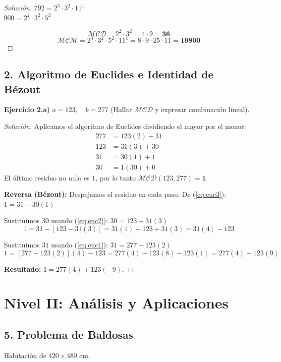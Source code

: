 \documentclass[12pt, letterpaper]{article}
\newenvironment{solucion}
    {\begin{proof}[Solución]}
    {\end{proof}}
\begin{document}
\begin{solucion}
    $792 = 2^3 \cdot 3^2 \cdot 11^1$ \\
    $900 = 2^2 \cdot 3^2 \cdot 5^2$
    
    \[ \mathcal{MCD} = 2^2 \cdot 3^2 = 4 \cdot 9 = \mathbf{36} \]
    \[ \mathcal{MCM} = 2^3 \cdot 3^2 \cdot 5^2 \cdot 11^1 = 8 \cdot 9 \cdot 25 \cdot 11 = \mathbf{19800} \]
\end{solucion}

\subsection*{2. Algoritmo de Euclides e Identidad de Bézout}

\textbf{Ejercicio 2.a)} $a = 123, \quad b = 277$ (Hallar $\mathcal{MCD}$ y expresar combinación lineal).

\begin{solucion}
    Aplicamos el algoritmo de Euclides dividiendo el mayor por el menor:
    \begin{align}
        277 &= 123(2) + 31 \label{eq:euc1} \\
        123 &= 31(3) + 30 \label{eq:euc2} \\
        31 &= 30(1) + 1 \label{eq:euc3} \\
        30 &= 1(30) + 0 \nonumber
    \end{align}
    El último residuo no nulo es $1$, por lo tanto $\mathcal{MCD}(123, 277) = \mathbf{1}$.

    \textbf{Reversa (Bézout):} Despejamos el residuo en cada paso.
    De (\ref{eq:euc3}): $1 = 31 - 30(1)$
    
    Sustituimos $30$ usando (\ref{eq:euc2}): $30 = 123 - 31(3)$
    \[ 1 = 31 - [123 - 31(3)] = 31(1) - 123 + 31(3) = 31(4) - 123 \]
    
    Sustituimos $31$ usando (\ref{eq:euc1}): $31 = 277 - 123(2)$
    \[ 1 = [277 - 123(2)](4) - 123 = 277(4) - 123(8) - 123(1) = 277(4) - 123(9) \]
    
    \textbf{Resultado:} $1 = 277(4) + 123(-9)$.
\end{solucion}

\section*{Nivel II: Análisis y Aplicaciones}

\subsection*{5. Problema de Baldosas}
Habitación de $420 \times 480$ cm.
\end{document}
